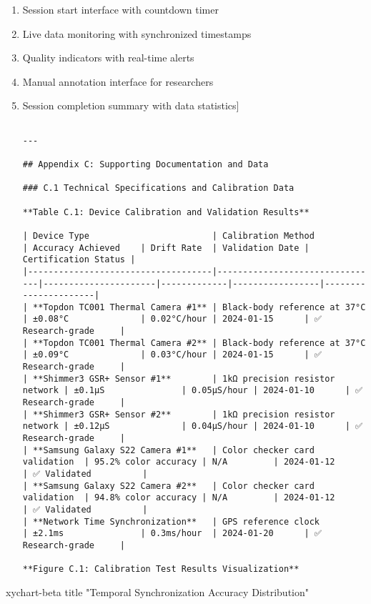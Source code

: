 \documentclass[12pt,a4paper]{report}
\begin{document}
\begin{enumerate}
\item Session start interface with countdown timer
\item Live data monitoring with synchronized timestamps
\item Quality indicators with real-time alerts
\item Manual annotation interface for researchers
\item Session completion summary with data statistics]
\begin{verbatim}

---

## Appendix C: Supporting Documentation and Data

### C.1 Technical Specifications and Calibration Data

**Table C.1: Device Calibration and Validation Results**

| Device Type                        | Calibration Method             | Accuracy Achieved    | Drift Rate  | Validation Date | Certification Status |
|------------------------------------|--------------------------------|----------------------|-------------|-----------------|----------------------|
| **Topdon TC001 Thermal Camera #1** | Black-body reference at 37°C   | ±0.08°C              | 0.02°C/hour | 2024-01-15      | ✅ Research-grade     |
| **Topdon TC001 Thermal Camera #2** | Black-body reference at 37°C   | ±0.09°C              | 0.03°C/hour | 2024-01-15      | ✅ Research-grade     |
| **Shimmer3 GSR+ Sensor #1**        | 1kΩ precision resistor network | ±0.1µS               | 0.05µS/hour | 2024-01-10      | ✅ Research-grade     |
| **Shimmer3 GSR+ Sensor #2**        | 1kΩ precision resistor network | ±0.12µS              | 0.04µS/hour | 2024-01-10      | ✅ Research-grade     |
| **Samsung Galaxy S22 Camera #1**   | Color checker card validation  | 95.2% color accuracy | N/A         | 2024-01-12      | ✅ Validated          |
| **Samsung Galaxy S22 Camera #2**   | Color checker card validation  | 94.8% color accuracy | N/A         | 2024-01-12      | ✅ Validated          |
| **Network Time Synchronization**   | GPS reference clock            | ±2.1ms               | 0.3ms/hour  | 2024-01-20      | ✅ Research-grade     |

**Figure C.1: Calibration Test Results Visualization**

\end{verbatim}
\end{enumerate}
xychart-beta
    title "Temporal Synchronization Accuracy Distribution"
\end{document}
